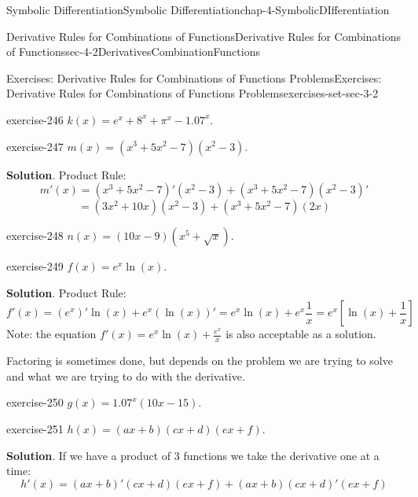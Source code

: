 \documentclass[oneside,10pt,]{book}
\numberwithin{equation}{section}
\begin{document}
\begin{chapterptx}{Symbolic Differentiation}{}{Symbolic Differentiation}{}{}{chap-4-SymbolicDIfferentiation}
\begin{sectionptx}{Derivative Rules for Combinations of Functions}{}{Derivative Rules for Combinations of Functions}{}{}{sec-4-2DerivativesCombinationFunctions}
\begin{exercises-subsection}{Exercises: Derivative Rules for Combinations of Functions Problems}{}{Exercises: Derivative Rules for Combinations of Functions Problems}{}{}{exercises-set-sec-3-2}
\begin{divisionexercise}{4}{}{}{exercise-246}%
\hypertarget{p-1572}{}%
\(k(x)=e^x+8^x+\pi^x-1.07^x\).%
\end{divisionexercise}%
\begin{divisionexercise}{5}{}{}{exercise-247}%
\hypertarget{p-1573}{}%
\(m(x)=(x^3+5x^2-7)(x^2-3)\).%
\par\smallskip%
\noindent\textbf{Solution}.\hypertarget{solution-123}{}\quad%
\hypertarget{p-1574}{}%
Product Rule:%
%
\begin{equation*}
m'(x)=(x^3+5x^2-7)'(x^2-3)+(x^3+5x^2-7) (x^2-3)'
\end{equation*}
%
\begin{equation*}
=(3x^2+10x)(x^2-3)+(x^3+5x^2-7)(2x)
\end{equation*}
\end{divisionexercise}%
\begin{divisionexercise}{6}{}{}{exercise-248}%
\hypertarget{p-1575}{}%
\(n(x)=(10x-9)(x^5+\sqrt{x})\).%
\end{divisionexercise}%
\begin{divisionexercise}{7}{}{}{exercise-249}%
\hypertarget{p-1576}{}%
\(f(x)=e^x \ln(x)\).%
\par\smallskip%
\noindent\textbf{Solution}.\hypertarget{solution-124}{}\quad%
\hypertarget{p-1577}{}%
Product Rule:%
%
\begin{equation*}
f'(x)=(e^x)' \ln(x)+e^x (\ln(x))'= e^x\ln(x)+e^x  \frac{1}{x}=e^x [\ln(x)+\frac{1}{x}]
\end{equation*}
\hypertarget{p-1578}{}%
Note: the equation \(f'(x)= e^x  \ln(x)+\frac{e^x}{x}\) is also acceptable as a solution.%
\par
\hypertarget{p-1579}{}%
Factoring is sometimes done, but depends on the problem we are trying to solve and what we are trying to do with the derivative.%
\end{divisionexercise}%
\begin{divisionexercise}{8}{}{}{exercise-250}%
\hypertarget{p-1580}{}%
\(g(x)=1.07^x (10x-15)\).%
\end{divisionexercise}%
\begin{divisionexercise}{9}{}{}{exercise-251}%
\hypertarget{p-1581}{}%
\(h(x)=(a x+b)(c x+d)(e x+f)\).%
\par\smallskip%
\noindent\textbf{Solution}.\hypertarget{solution-125}{}\quad%
\hypertarget{p-1582}{}%
If we have a product of 3 functions we take the derivative one at a time:%
%
\begin{equation*}
h'(x)=(a x+b)' (c x+d)(e x+f)+(a x+b) (c x+d)'  (e x+f)

\end{equation*}
\end{divisionexercise}
\end{exercises-subsection}
\end{sectionptx}
\end{chapterptx}
\end{document}
